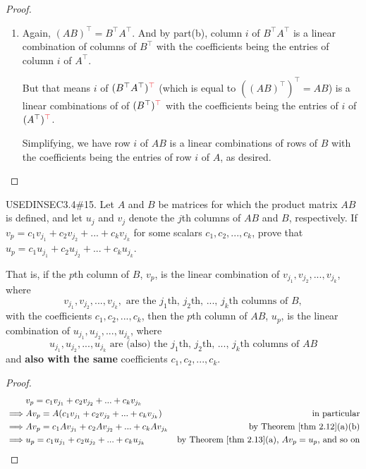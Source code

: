\begin{proof}
\begin{enumerate}
\item Again, \((AB)^\top = B^\top A^\top\).
And by part(b), column \(i\) of \(B^\top A^\top\) is a linear combination of columns of \(B^\top\) with the coefficients being the entries of column \(i\) of \(A^\top\).

But that means  \(i\) of \((B^\top A^\top)^{\RED{\top}}\) (which is equal to \(((AB)^\top)^\top = AB\)) is a linear combinations of  of \((B^\top)^{\RED{\top}}\) with the coefficients being the entries of  \(i\) of \((A^\top)^{\RED{\top}}\).

Simplifying, we have row \(i\) of \(AB\) is a linear combinations of rows of \(B\) with the coefficients being the entries of row \(i\) of \(A\), as desired.

\end{enumerate}
\end{proof}

\begin{exercise} \label{exercise 2.3.15}
USEDINSEC3.4\#15.
Let \(A\) and \(B\) be matrices for which the product matrix \(AB\) is defined, and let \(u_j\) and \(v_j\) denote the \(j\)th columns of \(AB\) and \(B\), respectively.
If \(v_p = c_1 v_{j_{1}} + c_2 v_{j_{2}} + ... + c_k v_{j_{k}}\) for some scalars \(c_1, c_2, ..., c_k\), prove that \(u_p = c_1 u_{j_{1}} + c_2 u_{j_{2}} + ... + c_k u_{j_{k}}\).
\end{exercise}

\begin{note}
That is, if the \(p\)th column of \(B\), \(v_p\), is the linear combination of \(v_{j_{1}}, v_{j_{2}}, ..., v_{j_{k}}\), where
\[
    v_{j_{1}}, v_{j_{2}}, ..., v_{j_{k}}, \text{ are the \(j_1\)th, \(j_2\)th, ..., \(j_k\)th columns of \(B\)}, 
\]
with the coefficients \(c_1, c_2, ..., c_k\),
then the \(p\)th column of \(AB\), \(u_p\), is the linear combination of \(u_{j_{1}}, u_{j_{2}}, ..., u_{j_{k}}\), where
\[
    u_{j_{1}}, u_{j_{2}}, ..., u_{j_{k}} \text{ are (also) the \(j_1\)th, \(j_2\)th, ..., \(j_k\)th columns of \(AB\)}
\]
and \textbf{also with the same} coefficients \(c_1, c_2, ..., c_k\).
\end{note}

\begin{proof}
\begin{align*}
             & v_p = c_1 v_{j_{1}} + c_2 v_{j_{2}} + ... + c_k v_{j_{k}} \\
    \implies & A v_p = A(c_1 v_{j_{1}} + c_2 v_{j_{2}} + ... + c_k v_{j_{k}}) & \text{in particular} \\
    \implies & A v_p = c_1 A v_{j_{1}} + c_2 A v_{j_{2}} + ... + c_k A v_{j_{k}} & \text{by \THM{2.12}(a)(b)} \\
    \implies & u_p = c_1 u_{j_1} + c_2 u_{j_2} + ... + c_k u_{j_k} & \text{by \THM{2.13}(a), \(A v_p = u_p\), and so on}
\end{align*}
\end{proof}

